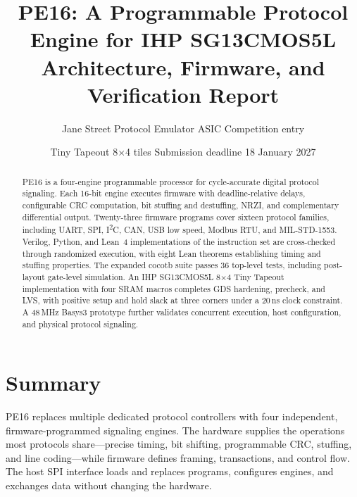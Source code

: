 \documentclass[11pt]{article}
\title{PE16: A Programmable Protocol Engine for IHP SG13CMOS5L\\[2pt]
\large Architecture, Firmware, and Verification Report}
\author{Jane Street Protocol Emulator ASIC Competition entry}
\date{Tiny Tapeout 8$\times$4 tiles \quad Submission deadline 18 January 2027}
\newcommand{\normalfill}{\setlength{\parfillskip}{0pt plus 1fil}}
\begin{document}
\maketitle

\begin{abstract}
PE16 is a four-engine programmable processor for cycle-accurate digital protocol signaling. Each 16-bit engine executes firmware with deadline-relative delays, configurable CRC computation, bit stuffing and destuffing, NRZI, and complementary differential output. Twenty-three firmware programs cover sixteen protocol families, including UART, SPI, I\textsuperscript{2}C, CAN, USB low speed, Modbus RTU, and MIL-STD-1553. Verilog, Python, and Lean~4 implementations of the instruction set are cross-checked through randomized execution, with eight Lean theorems establishing timing and stuffing properties. The expanded cocotb suite passes 36 top-level tests, including post-layout gate-level simulation. An IHP SG13CMOS5L 8$\times$4 Tiny Tapeout implementation with four SRAM macros completes GDS hardening, precheck, and LVS, with positive setup and hold slack at three corners under a 20\,ns clock constraint. A 48\,MHz Basys3 prototype further validates concurrent execution, host configuration, and physical protocol signaling.

\end{abstract}

{\normalfill\tableofcontents}
\clearpage

\section{Summary}

PE16 replaces multiple dedicated protocol controllers with four independent, firmware-programmed signaling engines. The hardware supplies the operations most protocols share---precise timing, bit shifting, programmable CRC, stuffing, and line coding---while firmware defines framing, transactions, and control flow. The host SPI interface loads and replaces programs, configures engines, and exchanges data without changing the hardware.
\end{document}
